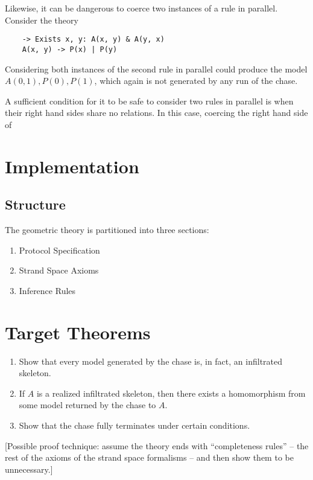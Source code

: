\documentclass[12pt]{article}
\begin{document}
Likewise, it can be dangerous to coerce two instances of a rule in
parallel. Consider the theory
\begin{verbatim}
    -> Exists x, y: A(x, y) & A(y, x)
    A(x, y) -> P(x) | P(y)
\end{verbatim}
Considering both instances of the second rule in parallel could
produce the model ${A(0, 1), P(0), P(1)}$, which again is not
generated by any run of the chase.

A sufficient condition for it to be safe to consider two rules in
parallel is when their right hand sides share no relations. In this
case, coercing the right hand side of 



\section{Implementation}

\subsection{Structure}
The geometric theory is partitioned into three sections:

\begin{enumerate}
\item Protocol Specification
\item Strand Space Axioms
\item Inference Rules
\end{enumerate}

\section{Target Theorems}

\begin{enumerate}
\item
Show that every model generated by the chase is, in fact, an
infiltrated skeleton.
\item
If $A$ is a realized infiltrated skeleton, then there exists a
homomorphism from some model returned by the chase to $A$.
\item
Show that the chase fully terminates under certain conditions.
\end{enumerate}

[Possible proof technique: assume the theory ends with ``completeness
  rules'' -- the rest of the axioms of the strand space formalisms --
  and then show them to be unnecessary.]
\end{document}
